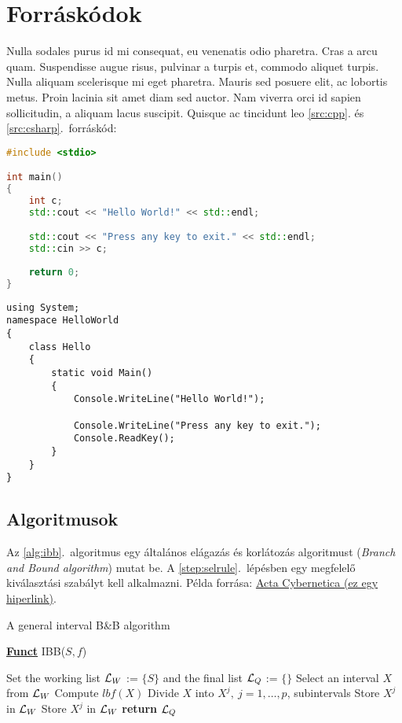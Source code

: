 \section{Forráskódok}

Nulla sodales purus id mi consequat, eu venenatis odio pharetra. Cras a arcu quam. Suspendisse augue risus, pulvinar a turpis et, commodo aliquet turpis. Nulla aliquam scelerisque mi eget pharetra. Mauris sed posuere elit, ac lobortis metus. Proin lacinia sit amet diam sed auctor. Nam viverra orci id sapien sollicitudin, a aliquam lacus suscipit. Quisque ac tincidunt leo \ref{src:cpp}. és \ref{src:csharp}.~forráskód:

\begin{lstlisting}[language={C++}]
#include <stdio>

int main() 
{
	int c;
	std::cout << "Hello World!" << std::endl;

	std::cout << "Press any key to exit." << std::endl;
	std::cin >> c;
	
	return 0;
}
\end{lstlisting}

\begin{lstlisting}[language={[Sharp]C}]
using System;
namespace HelloWorld
{
	class Hello 
	{
		static void Main() 
		{
			Console.WriteLine("Hello World!");
			
			Console.WriteLine("Press any key to exit.");
			Console.ReadKey();
		}
	}
}
\end{lstlisting}

\subsection{Algoritmusok}

Az \ref{alg:ibb}.~algoritmus egy általános elágazás és korlátozás algoritmust (\emph{Branch and Bound algorithm}) mutat be. A \ref{step:selrule}.~lépésben egy megfelelő kiválasztási szabályt kell alkalmazni.
Példa forrása: \href{https://www.inf.u-szeged.hu/actacybernetica/}{Acta Cybernetica (ez egy hiperlink)}.

\begin{algorithm}[H]
\caption{A general interval B\&B algorithm}
\label{alg:ibb}
\textbf{\underline{Funct}} IBB($S,f$)
\begin{algorithmic}[1] %
\State Set the working list ${\cal L}_W$ := $\{S\}$ and the final list ${\cal L}_Q$ := $\{\}$
 \label{alg:igoend}
	\State Select an interval $X$ from ${\cal L}_W$ \label{step:selrule}
	\State Compute $lbf(X)$ 
	 
		\State Divide $X$ into $X^j,\ j=1,\dots, p$, subintervals   
			 
				\State Store $X^j$ in ${\cal L}_W$
			\Else
				\State Store $X^j$ in ${\cal L}_W$
			\EndIf
		\EndFor
	\EndIf
\EndWhile
\State \textbf{return} ${\cal L}_Q$
\end{algorithmic}
\end{algorithm}

